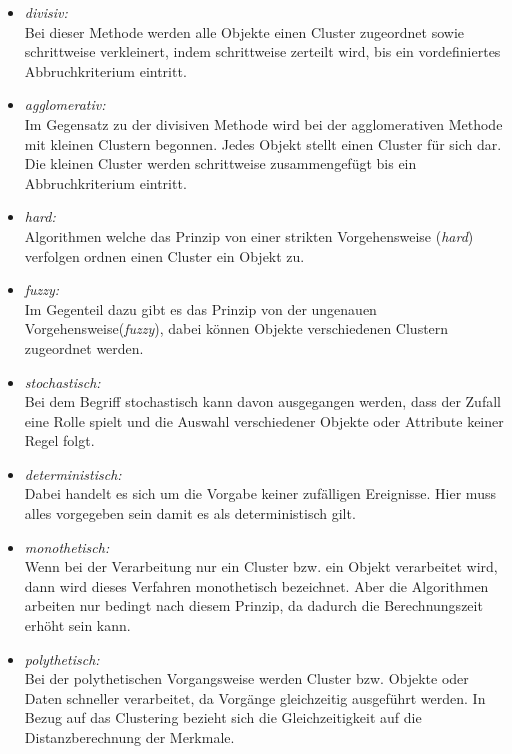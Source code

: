 \begin{itemize}
	\item\textit{divisiv:}\\
	Bei dieser Methode werden alle Objekte einen Cluster zugeordnet sowie schrittweise verkleinert, indem schrittweise zerteilt wird, bis ein vordefiniertes Abbruchkriterium eintritt.\\
	
	\item\textit{agglomerativ:}\\
	Im Gegensatz zu der divisiven Methode wird bei der agglomerativen Methode mit kleinen Clustern begonnen. Jedes Objekt stellt einen Cluster für sich dar. Die kleinen Cluster werden schrittweise zusammengefügt bis ein Abbruchkriterium eintritt.\\
	
	\item\textit{hard:}\\
	Algorithmen welche das Prinzip von einer strikten Vorgehensweise (\textit{hard}) verfolgen ordnen einen Cluster ein Objekt zu.\\
	
	\item\textit{fuzzy:}\\
	Im Gegenteil dazu gibt es das Prinzip von der ungenauen Vorgehensweise(\textit{fuzzy}), dabei können Objekte verschiedenen Clustern zugeordnet werden. \\
	
	\item\textit{stochastisch:}\\
		Bei dem Begriff stochastisch kann davon ausgegangen werden, dass der Zufall eine Rolle spielt und die Auswahl verschiedener Objekte oder Attribute keiner Regel folgt.\\
	
	
	\item\textit{deterministisch:}\\
	Dabei handelt es sich um die Vorgabe keiner zufälligen Ereignisse. Hier muss alles vorgegeben sein damit es als deterministisch gilt.\\
	
	\item\textit{monothetisch:}\\
	Wenn bei der Verarbeitung nur ein Cluster bzw. ein Objekt verarbeitet wird, dann wird dieses Verfahren monothetisch bezeichnet. Aber die Algorithmen arbeiten nur bedingt nach diesem Prinzip, da dadurch die Berechnungszeit erhöht sein kann.\\
	
		\item\textit{polythetisch:}\\
		Bei der polythetischen Vorgangsweise werden Cluster bzw. Objekte oder Daten schneller verarbeitet, da Vorgänge gleichzeitig ausgeführt werden. In Bezug auf das Clustering bezieht sich die Gleichzeitigkeit auf die Distanzberechnung der Merkmale. 
	
\end{itemize}

